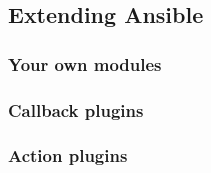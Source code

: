 \subsection*{Extending Ansible}

\subsubsection*{Your own modules}

\subsubsection*{Callback plugins}

\subsubsection*{Action plugins}
